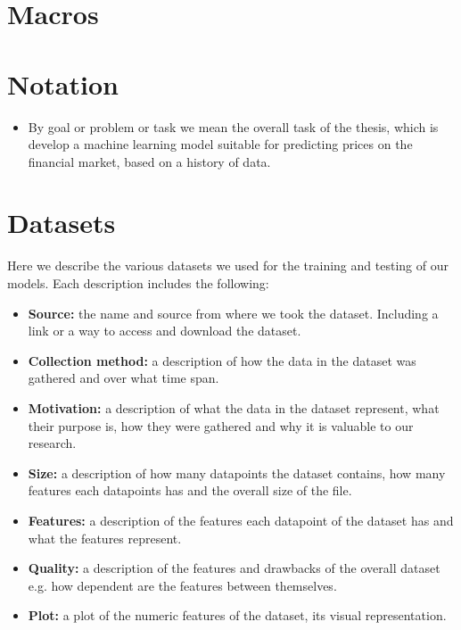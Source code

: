 \section{Macros}

\section{Notation}
\begin{itemize}
	\item By goal or problem or task we mean the overall task of the thesis, which is develop a machine learning model suitable for predicting prices on the financial market, based on a history of data.
\end{itemize}

\section{Datasets}
Here we describe the various datasets we used for the training and testing of our models. Each description includes the following:
\begin{itemize}
	\item \textbf{Source:} the name and source from where we took the dataset. Including a link or a way to access and download the dataset.
	\item \textbf{Collection method:} a description of how the data in the dataset was gathered and over what time span.
	\item \textbf{Motivation:} a description of what the data in the dataset represent, what their purpose is, how they were gathered and why it is valuable to our research.
	\item \textbf{Size:} a description of how many datapoints the dataset contains, how many features each datapoints has and the overall size of the file.
	\item \textbf{Features:} a description of the features each datapoint of the dataset has and what the features represent.
	\item \textbf{Quality:} a description of the features and drawbacks of the overall dataset e.g. how dependent are the features between themselves.
	\item \textbf{Plot:} a plot of the numeric features of the dataset, its visual representation.
\end{itemize}
